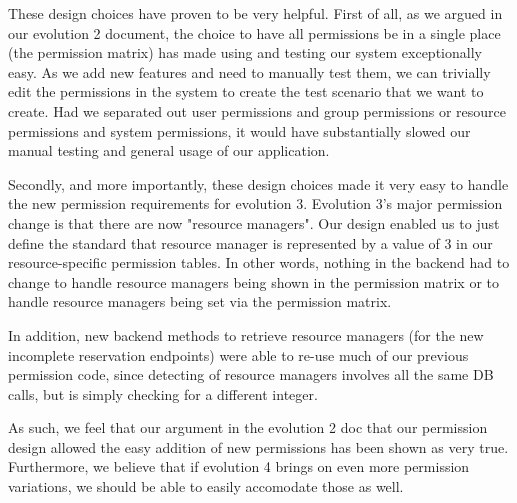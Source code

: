 \documentclass[12pt]{article}
\begin{document}
These design choices have proven to be very helpful. First of all, as we argued in our evolution 2 document, the choice to have all permissions be in a single place (the permission matrix) has made using and testing our system exceptionally easy. As we add new features and need to manually test them, we can trivially edit the permissions in the system to create the test scenario that we want to create. Had we separated out user permissions and group permissions or resource permissions and system permissions, it would have substantially slowed our manual testing and general usage of our application. 

Secondly, and more importantly, these design choices made it very easy to handle the new permission requirements for evolution 3. Evolution 3's major permission change is that there are now "resource managers". Our design enabled us to just define the standard that resource manager is represented by a value of 3 in our resource-specific permission tables. In other words, nothing in the backend had to change to handle resource managers being shown in the permission matrix or to handle resource managers being set via the permission matrix. 

In addition, new backend methods to retrieve resource managers (for the new incomplete reservation endpoints) were able to re-use much of our previous permission code, since detecting of resource managers involves all the same DB calls, but is simply checking for a different integer. 

As such, we feel that our argument in the evolution 2 doc that our permission design allowed the easy addition of new permissions has been shown as very true. Furthermore, we believe that if evolution 4 brings on even more permission variations, we should be able to easily accomodate those as well. 
\end{document}
